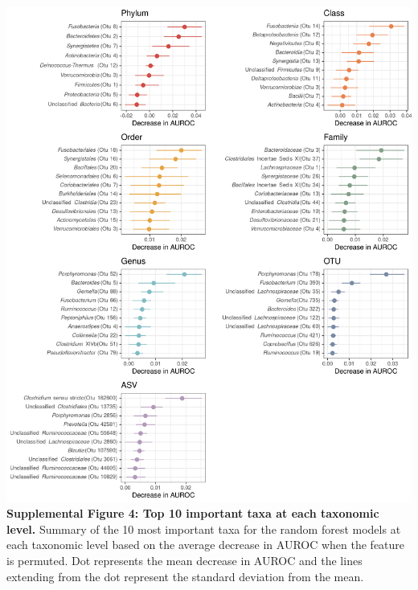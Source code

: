 \documentclass[
]{article}
\begin{document}
\includegraphics[width=\textwidth,height=0.85\textheight]{figure_s4.png}
\textbf{Supplemental Figure 4: Top 10 important taxa at each taxonomic
level.} Summary of the 10 most important taxa for the random forest
models at each taxonomic level based on the average decrease in AUROC
when the feature is permuted. Dot represents the mean decrease in AUROC
and the lines extending from the dot represent the standard deviation
from the mean.
\end{document}
